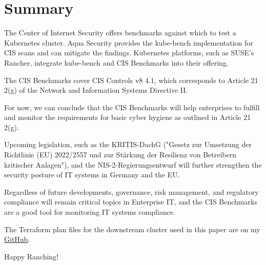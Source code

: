 %
%

\pagebreak
\section{Summary}

\onehalfspacing

The Center of Internet Security offers benchmarks against which to test a Kubernetes cluster. Aqua Security provides the kube-bench implementation for CIS scans and can mitigate the findings. Kubernetes platforms, such as SUSE's Rancher, integrate kube-bench and CIS Benchmarks into their offering.

The CIS Benchmarks cover CIS Controls v8 4.1, which corresponds to Article 21 2(g) of the Network and Information Systems Directive II.

For now, we can conclude that the CIS Benchmarks will help enterprises to fulfill and monitor the requirements for basic cyber hygiene as outlined in Article 21 2(g).

Upcoming legislation, such as the KRITIS-DachG ("Gesetz zur Umsetzung der Richtlinie (EU) 2022/2557 und zur Stärkung der Resilienz von Betreibern kritischer Anlagen"), and the NIS-2-Regierungsentwurf will further strengthen the security posture of IT systems in Germany and the EU.

Regardless of future developments, governance, risk management, and regulatory compliance will remain critical topics in Enterprise IT, and the CIS Benchmarks are a good tool for monitoring IT systems compliance.

The Terraform plan files for the downstream cluster used in this paper are on my \href{https://github.com/chfrank-cgn/Rancher}{GitHub}.

Happy Ranching!
